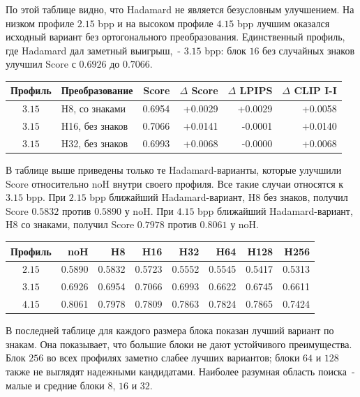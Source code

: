\documentclass[a4paper,12pt]{article}
\begin{document}
По этой таблице видно, что Hadamard не является безусловным улучшением. На низком профиле $2.15$ bpp и на высоком профиле $4.15$ bpp лучшим оказался исходный вариант без ортогонального преобразования. Единственный профиль, где Hadamard дал заметный выигрыш,~- $3.15$ bpp: блок $16$ без случайных знаков улучшил Score с $0.6926$ до $0.7066$.

\begin{center}
\small
\begin{tabular}{clrrrr}
\hline
Профиль & Преобразование & Score & $\Delta$ Score & $\Delta$ LPIPS & $\Delta$ CLIP I-I \\
\hline
$3.15$ & H8, со знаками & 0.6954 & +0.0029 & +0.0029 & +0.0058 \\
$3.15$ & H16, без знаков & 0.7066 & +0.0141 & -0.0001 & +0.0140 \\
$3.15$ & H32, без знаков & 0.6993 & +0.0068 & -0.0000 & +0.0068 \\
\hline
\end{tabular}
\end{center}

В таблице выше приведены только те Hadamard-варианты, которые улучшили Score относительно noH внутри своего профиля. Все такие случаи относятся к $3.15$ bpp. При $2.15$ bpp ближайший Hadamard-вариант, H8 без знаков, получил Score $0.5832$ против $0.5890$ у noH. При $4.15$ bpp ближайший Hadamard-вариант, H8 со знаками, получил Score $0.7978$ против $0.8061$ у noH.

\begin{center}
\small
\begin{tabular}{crrrrrrr}
\hline
Профиль & noH & H8 & H16 & H32 & H64 & H128 & H256 \\
\hline
$2.15$ & 0.5890 & 0.5832 & 0.5723 & 0.5552 & 0.5545 & 0.5417 & 0.5313 \\
$3.15$ & 0.6926 & 0.6954 & 0.7066 & 0.6993 & 0.6622 & 0.6745 & 0.6611 \\
$4.15$ & 0.8061 & 0.7978 & 0.7809 & 0.7863 & 0.7824 & 0.7865 & 0.7424 \\
\hline
\end{tabular}
\end{center}

В последней таблице для каждого размера блока показан лучший вариант по знакам. Она показывает, что большие блоки не дают устойчивого преимущества. Блок $256$ во всех профилях заметно слабее лучших вариантов; блоки $64$ и $128$ также не выглядят надежными кандидатами. Наиболее разумная область поиска~- малые и средние блоки $8$, $16$ и $32$.
\end{document}
